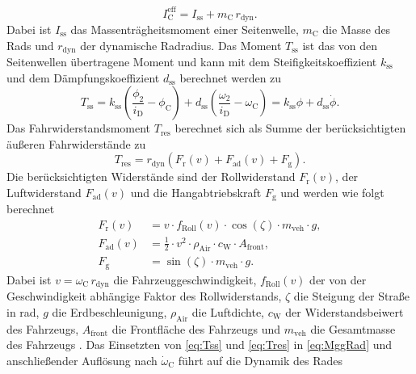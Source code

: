 \begin{equation}
I^\mathrm{eff}_\mathrm{C} = I_\mathrm{ss} + m_\mathrm{C}\,r_\mathrm{dyn}.
\end{equation}
Dabei ist $I_\mathrm{ss}$ das Massenträgheitsmoment einer Seitenwelle, $m_\mathrm{C}$ die Masse des Rads und $r_\mathrm{dyn}$ der dynamische Radradius. Das Moment $T_\mathrm{ss}$ ist das von den Seitenwellen übertragene Moment und kann mit dem Steifigkeitskoeffizient $k_\mathrm{ss}$ und dem Dämpfungskoeffizient $d_\mathrm{ss}$ berechnet werden zu
\begin{equation}\label{eq:Tss}
T_\mathrm{ss} = k_\mathrm{ss}\left(\frac{\phi_2}{i_{\mathrm{D}}} - \phi_\mathrm{C}\right) + d_\mathrm{ss}\left(\frac{\omega_2}{i_{\mathrm{D}}} - \omega_\mathrm{C}\right) = k_\mathrm{ss} \phi + d_\mathrm{ss} \dot{\phi}.
\end{equation}
Das Fahrwiderstandsmoment $T_\mathrm{res}$ berechnet sich als Summe der berücksichtigten äußeren Fahrwiderstände zu
\begin{equation}\label{eq:Tres}
T_\mathrm{res} = r_\mathrm{dyn}\left(F_\mathrm{r}(v) + F_\mathrm{ad}(v) + F_\mathrm{g}\right). 
\end{equation}
Die berücksichtigten Widerstände sind der Rollwiderstand $F_\mathrm{r}(v)$, der Luftwiderstand $F_\mathrm{ad}(v)$ und die Hangabtriebskraft $F_\mathrm{g}$ und werden wie folgt berechnet
\begin{subequations}\label{eq:Fr_Fas_Fg}
\begin{align}
F_\mathrm{r}(v) &= v \cdot f_\mathrm{Roll}(v)\cdot \cos\left(\zeta\right)\cdot m_\mathrm{veh}\cdot g, \\
F_\mathrm{ad}(v) &= \frac{1}{2}\cdot v^2\cdot\rho_\mathrm{Air}\cdot c_\mathrm{W}\cdot A_\mathrm{front},\\
F_\mathrm{g} &= \sin\left(\zeta \right)\cdot m_\mathrm{veh}\cdot g.
\end{align}
\end{subequations}
Dabei ist $v = \omega_\mathrm{C}\,r_\mathrm{dyn}$ die Fahrzeuggeschwindigkeit, $f_\mathrm{Roll}(v)$ der von der Geschwindigkeit abhängige Faktor
des Rollwiderstands, $\zeta$ die Steigung der Straße in rad, $g$ die Erdbeschleunigung, $\rho_\mathrm{Air}$ die Luftdichte, $c_\mathrm{W}$ der Widerstandsbeiwert des Fahrzeugs, $A_\mathrm{front}$ die Frontfläche des
Fahrzeugs und $m_\mathrm{veh}$ die Gesamtmasse des Fahrzeugs \cite[S.~3ff]{Naunheimer.2007}.
Das Einsetzten von \eqref{eq:Tss} und \eqref{eq:Tres} in \eqref{eq:MggRad} und anschließender Auflösung nach $\dot{\omega}_\mathrm{C}$ führt auf die Dynamik des Rades
